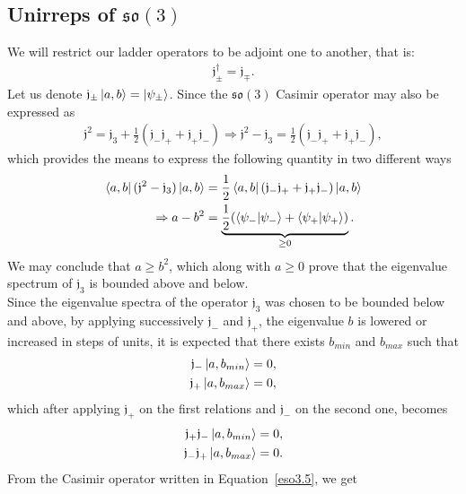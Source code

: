 \documentclass[12pt,a4paper]{report}
\theoremstyle{definition}
\theoremstyle{remark}
\theoremstyle{remark}
\begin{document}
\subsection{Unirreps of $\mathfrak{so}(3)$}
We will restrict our ladder operators to be adjoint one to another, that is:
\begin{align*}
\mathfrak{j}_\pm^{\dagger}=\mathfrak{j}_\mp.
\end{align*}
Let us denote $\mathfrak{j}_\pm\ket{a,b}=\ket{\psi_\pm}$. Since the $\mathfrak{so}(3)$ Casimir operator may also be expressed as
\begin{align*}
\mathfrak{j}^2=\mathfrak{j}_3+\frac{1}{2}(\mathfrak{j}_-\mathfrak{j}_++\mathfrak{j}_+\mathfrak{j}_-)\Rightarrow\mathfrak{j}^2-\mathfrak{j}_3=\frac{1}{2}(\mathfrak{j}_-\mathfrak{j}_++\mathfrak{j}_+\mathfrak{j}_-),
\end{align*}
which provides the means to express the following quantity in two different ways
\begin{align*}
\bra{a,b}(\mathfrak{j}^2-\mathfrak{j}_3)\ket{a,b}&=\frac{1}{2}\bra{a,b}(\mathfrak{j}_-\mathfrak{j}_++\mathfrak{j}_+\mathfrak{j}_-)\ket{a,b} \\
\Rightarrow a-b^2&=\underbrace{\frac{1}{2}(\braket{\psi_-|\psi_-}+\braket{\psi_+|\psi_+})}_{\geq 0}.
\end{align*}
We may conclude that $a\geq b^2$, which along with $a\geq 0$ prove that the eigenvalue spectrum of $\mathfrak{j}_3$ is bounded above and below.  \\ \indent
Since the eigenvalue spectra of the operator $\mathfrak{j}_3$ was chosen to be bounded below and above, by applying successively  $\mathfrak{j}_-$ and $\mathfrak{j}_+$, the eigenvalue $b$ is lowered or increased in steps of units, it is expected that there exists $b_{min}$ and  $b_{max}$ such that
\begin{align*}
\mathfrak{j}_-\ket{a,b_{min}}&=0,\\
\mathfrak{j}_+\ket{a,b_{max}}&=0,
\end{align*} 
which after applying $\mathfrak{j}_+$ on the first relations and $\mathfrak{j}_-$ on the second one, becomes
\begin{equation}\label{eso3.6}
\begin{aligned}
\mathfrak{j}_+\mathfrak{j}_-\ket{a,b_{min}}&=0,\\
\mathfrak{j}_-\mathfrak{j}_+\ket{a,b_{max}}&=0.
\end{aligned}
\end{equation}
From the Casimir operator written in Equation~\ref{eso3.5}, we get
\end{document}
